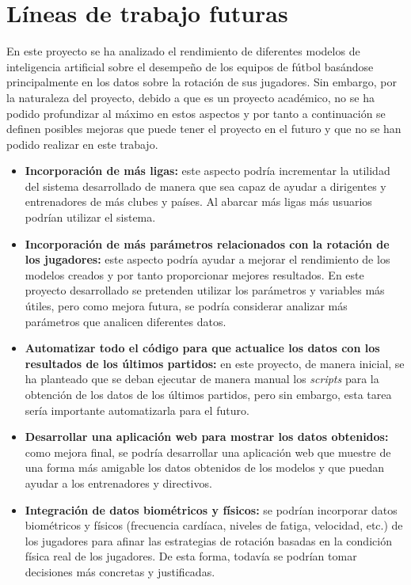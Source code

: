 \section{Líneas de trabajo futuras}


En este proyecto se ha analizado el rendimiento de diferentes modelos de inteligencia artificial sobre el desempeño de los equipos de fútbol basándose principalmente en los datos sobre la rotación de sus jugadores. Sin embargo, por la naturaleza del proyecto, debido a que es un proyecto académico, no se ha podido profundizar al máximo en estos aspectos y por tanto a continuación se definen posibles mejoras que puede tener el proyecto en el futuro y que no se han podido realizar en este trabajo.
\begin{itemize}
    \item \textbf{Incorporación de más ligas: } este aspecto podría incrementar la utilidad del sistema desarrollado de manera que sea capaz de ayudar a dirigentes y entrenadores de más clubes y países. Al abarcar más ligas más usuarios podrían utilizar el sistema.
    \item \textbf{Incorporación de más parámetros relacionados con la rotación de los jugadores:} este aspecto podría ayudar a mejorar el rendimiento de los modelos creados y por tanto proporcionar mejores resultados. En este proyecto desarrollado se pretenden utilizar los parámetros y variables más útiles, pero como mejora futura, se podría considerar analizar más parámetros que analicen diferentes datos.
    \item \textbf{Automatizar todo el código para que actualice los datos con los resultados de los últimos partidos:} en este proyecto, de manera inicial, se ha planteado que se deban ejecutar de manera manual los \textit{scripts} para la obtención de los datos de los últimos partidos, pero sin embargo, esta tarea sería importante automatizarla para el futuro.
    \item \textbf{Desarrollar una aplicación web para mostrar los datos obtenidos:} como mejora final, se podría desarrollar una aplicación web que muestre de una forma más amigable los datos obtenidos de los modelos y que puedan ayudar a los entrenadores y directivos. 
    \item \textbf{Integración de datos biométricos y físicos:} se podrían incorporar datos biométricos y físicos (frecuencia cardíaca, niveles de fatiga, velocidad, etc.) de los jugadores para afinar las estrategias de rotación basadas en la condición física real de los jugadores. De esta forma, todavía se podrían tomar decisiones más concretas y justificadas.

\end{itemize}
